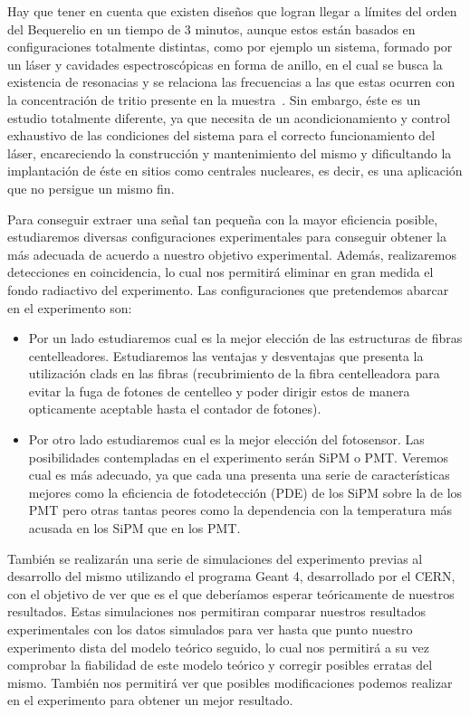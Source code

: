 Hay que tener en cuenta que existen diseños que logran llegar a límites del orden del Bequerelio en un tiempo de 3 minutos, aunque estos están basados en configuraciones totalmente distintas, como por ejemplo un sistema, formado por un láser y cavidades espectroscópicas en forma de anillo, en el cual se  busca la existencia de resonacias y  se relaciona las frecuencias a las que estas ocurren con la concentración de tritio presente en la muestra~\cite{Anillo}. Sin embargo, éste es un estudio totalmente diferente, ya que necesita de un acondicionamiento y control exhaustivo de las condiciones del sistema para el correcto funcionamiento del láser, encareciendo la construcción y mantenimiento del mismo y dificultando la implantación de éste en sitios como centrales nucleares, es decir, es una aplicación que no persigue un mismo fin. 

Para conseguir extraer una señal tan pequeña con la mayor eficiencia posible,  estudiaremos diversas configuraciones experimentales para conseguir obtener la más adecuada de acuerdo a nuestro objetivo experimental. Además, realizaremos detecciones en coincidencia, lo cual nos permitirá eliminar en gran medida el fondo radiactivo del experimento. Las configuraciones que pretendemos abarcar en el experimento son: 
\begin{itemize}
\item {}
Por un lado estudiaremos cual es la mejor elección de las estructuras de fibras centelleadores. Estudiaremos las ventajas y desventajas que presenta la utilización clads en las fibras (recubrimiento de la fibra centelleadora para evitar la fuga de fotones de centelleo y poder dirigir estos de manera opticamente aceptable hasta el contador de fotones). 
\item {}
Por otro lado estudiaremos cual es la mejor elección del fotosensor. Las posibilidades contempladas en el experimento serán SiPM o PMT. Veremos cual es más adecuado, ya que cada una presenta una serie de características mejores como la eficiencia de fotodetección (PDE) de los SiPM sobre la de los PMT pero otras tantas peores como la dependencia con la temperatura más acusada en los SiPM que en los PMT.
\end{itemize}

También se realizarán una serie de simulaciones del experimento previas al desarrollo del mismo utilizando el programa Geant 4, desarrollado por el CERN, con el objetivo de ver que es el que deberíamos esperar teóricamente de nuestros resultados. Estas simulaciones nos permitiran comparar nuestros resultados experimentales con los datos simulados para ver hasta que punto nuestro experimento dista del modelo teórico seguido, lo cual nos permitirá a su vez comprobar la fiabilidad de este modelo teórico y corregir posibles erratas del mismo. También nos permitirá ver que posibles modificaciones podemos realizar en el experimento para obtener un mejor resultado.

